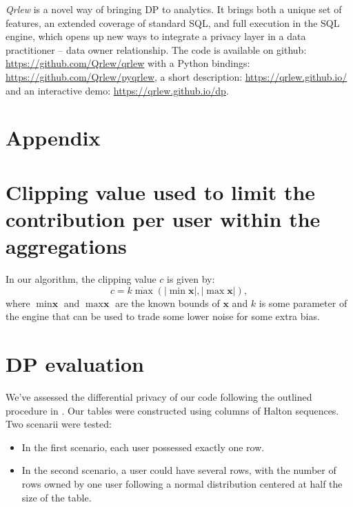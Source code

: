 \documentclass{article}
\newcommand{\qrlew}{\emph{Qrlew}}
\begin{document}
    \qrlew{} is a novel way of bringing DP to analytics. It brings both a unique set of features, an extended coverage of standard SQL, and full execution in the SQL engine, which opens up new ways to integrate a privacy layer in a data practitioner -- data owner relationship.
    The code is available on github: \url{https://github.com/Qrlew/qrlew} with a Python bindings: \url{https://github.com/Qrlew/pyqrlew}, a short description: \url{https://qrlew.github.io/}\\
    and an interactive demo: \url{https://qrlew.github.io/dp}.
    
    
    
    \appendix
    
    \section*{Appendix}
    
    \section*{Clipping value used to limit the contribution per user within the aggregations}
    \label{sec:limit_contrib_per_user}
    
    In our algorithm, the clipping value $c$ is given by:
    \begin{equation}
        c = k \dot\max ( |\min \textbf{x}|, |\max \textbf{x}|),
    \end{equation}
    where $\min \textbf{x}$ and $\max \textbf{x}$ are the known bounds of $\textbf{x}$ and $k$ is some parameter of the engine that can be used to trade some lower noise for some extra bias.
    
    \section*{DP evaluation}
    We've assessed the differential privacy of our code following the outlined procedure in \cite{wilson2019differentially}. Our tables were constructed using columns of Halton sequences.
    Two scenarii were tested:
    
    \begin{itemize}
        \item In the first scenario, each user possessed exactly one row.
        \item In the second scenario, a user could have several rows, with the number of rows owned by one user following a normal distribution centered at half the size of the table.
    \end{itemize}
    
\end{document}
